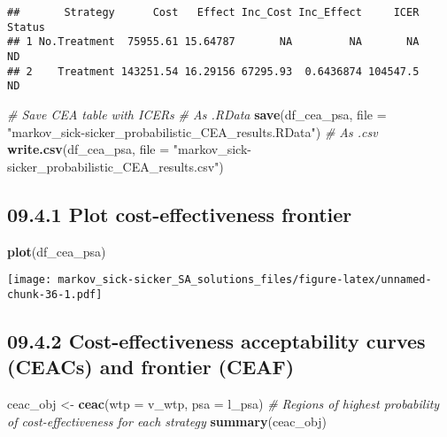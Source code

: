 \documentclass[
]{article}
\newenvironment{Shaded}{\begin{snugshade}}{\end{snugshade}}
\newcommand{\CommentTok}[1]{\textcolor[rgb]{0.56,0.35,0.01}{\textit{#1}}}
\newcommand{\DataTypeTok}[1]{\textcolor[rgb]{0.13,0.29,0.53}{#1}}
\newcommand{\KeywordTok}[1]{\textcolor[rgb]{0.13,0.29,0.53}{\textbf{#1}}}
\newcommand{\NormalTok}[1]{#1}
\newcommand{\StringTok}[1]{\textcolor[rgb]{0.31,0.60,0.02}{#1}}
\begin{document}
\begin{verbatim}
##       Strategy      Cost   Effect Inc_Cost Inc_Effect     ICER Status
## 1 No.Treatment  75955.61 15.64787       NA         NA       NA     ND
## 2    Treatment 143251.54 16.29156 67295.93  0.6436874 104547.5     ND
\end{verbatim}

\begin{Shaded}
\begin{Highlighting}[]
\CommentTok{# Save CEA table with ICERs}
\CommentTok{# As .RData}
\KeywordTok{save}\NormalTok{(df_cea_psa, }
     \DataTypeTok{file =} \StringTok{"markov_sick-sicker_probabilistic_CEA_results.RData"}\NormalTok{)}
\CommentTok{# As .csv}
\KeywordTok{write.csv}\NormalTok{(df_cea_psa, }
          \DataTypeTok{file =} \StringTok{"markov_sick-sicker_probabilistic_CEA_results.csv"}\NormalTok{)}
\end{Highlighting}
\end{Shaded}

\hypertarget{plot-cost-effectiveness-frontier}{%
\subsection{09.4.1 Plot cost-effectiveness
frontier}\label{plot-cost-effectiveness-frontier}}

\begin{Shaded}
\begin{Highlighting}[]
\KeywordTok{plot}\NormalTok{(df_cea_psa)}
\end{Highlighting}
\end{Shaded}

\texttt{[image: markov\_sick-sicker\_SA\_solutions\_files/figure-latex/unnamed-chunk-36-1.pdf]}

\hypertarget{cost-effectiveness-acceptability-curves-ceacs-and-frontier-ceaf}{%
\subsection{09.4.2 Cost-effectiveness acceptability curves (CEACs) and
frontier
(CEAF)}\label{cost-effectiveness-acceptability-curves-ceacs-and-frontier-ceaf}}

\begin{Shaded}
\begin{Highlighting}[]
\NormalTok{ceac_obj <-}\StringTok{ }\KeywordTok{ceac}\NormalTok{(}\DataTypeTok{wtp =}\NormalTok{ v_wtp, }\DataTypeTok{psa =}\NormalTok{ l_psa)}
\CommentTok{# Regions of highest probability of cost-effectiveness for each strategy}
\KeywordTok{summary}\NormalTok{(ceac_obj)}
\end{Highlighting}
\end{Shaded}
\end{document}
